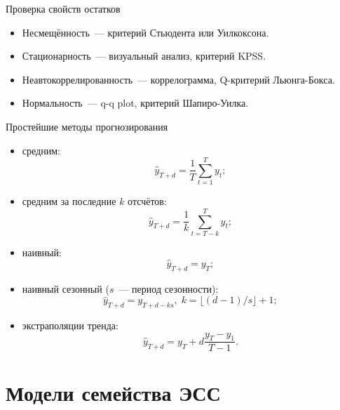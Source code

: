 \documentclass[9pt,pdf,utf8,hyperref={unicode},aspectratio=169]{beamer}
\begin{document}
\begin{frame}{Проверка свойств остатков}
	\begin{itemize}
		\item Несмещённость~--- критерий Стьюдента или Уилкоксона.
		\item Стационарность~--- визуальный анализ, критерий KPSS.
		\item Неавтокоррелированность~--- коррелограмма, Q-критерий Льюнга-Бокса.
		\item Нормальность~--- q-q plot, критерий Шапиро-Уилка.
	\end{itemize}
\end{frame}



\begin{frame}{Простейшие методы прогнозирования}
	\begin{itemize}
		\item средним:
		$$\hat{y}_{T+d} = \frac1{T}\sum_{t=1}^T y_t;$$
		\item средним за последние $k$ отсчётов:
		$$\hat{y}_{T+d} = \frac1{k}\sum_{t=T-k}^T y_t;$$
		\item наивный:
		$$\hat{y}_{T+d} = y_T;$$
		\item наивный сезонный ($s$~--- период сезонности):
		$$\hat{y}_{T+d} = y_{T+d-ks}, \; k = \lfloor\left(d-1\right)/s\rfloor+1;$$
		\item экстраполяции тренда:
		$$\hat{y}_{T+d} = y_T + d \frac{y_T-y_1}{T-1}.$$
	\end{itemize}
\end{frame}





\section{Модели семейства ЭСС}
\end{document}
